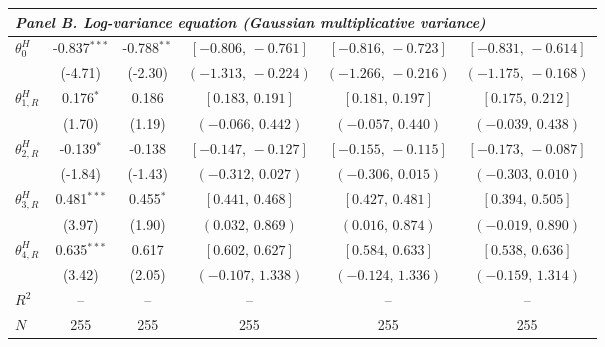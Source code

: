 \begin{table}[!htbp]
\begin{threeparttable}
\begin{tabular}{lccccc}
\midrule
\multicolumn{6}{l}{\textit{Panel B. Log-variance equation (Gaussian multiplicative variance)}} \\
\midrule
$\theta^{H}_0$ & -0.837$^{***}$ & -0.788$^{**}$ & $[-0.806,\,-0.761]$ & $[-0.816,\,-0.723]$ & $[-0.831,\,-0.614]$ \\
 & (-4.71) & (-2.30) & $(-1.313,\,-0.224)$ & $(-1.266,\,-0.216)$ & $(-1.175,\,-0.168)$ \\
\midrule
$\theta^{H}_{1,R}$ & 0.176$^{*}$ & 0.186 & $[0.183,\,0.191]$ & $[0.181,\,0.197]$ & $[0.175,\,0.212]$ \\
 & (1.70) & (1.19) & $(-0.066,\,0.442)$ & $(-0.057,\,0.440)$ & $(-0.039,\,0.438)$ \\
$\theta^{H}_{2,R}$ & -0.139$^{*}$ & -0.138 & $[-0.147,\,-0.127]$ & $[-0.155,\,-0.115]$ & $[-0.173,\,-0.087]$ \\
 & (-1.84) & (-1.43) & $(-0.312,\,0.027)$ & $(-0.306,\,0.015)$ & $(-0.303,\,0.010)$ \\
$\theta^{H}_{3,R}$ & 0.481$^{***}$ & 0.455$^{*}$ & $[0.441,\,0.468]$ & $[0.427,\,0.481]$ & $[0.394,\,0.505]$ \\
 & (3.97) & (1.90) & $(0.032,\,0.869)$ & $(0.016,\,0.874)$ & $(-0.019,\,0.890)$ \\
$\theta^{H}_{4,R}$ & 0.635$^{***}$ & 0.617 & $[0.602,\,0.627]$ & $[0.584,\,0.633]$ & $[0.538,\,0.636]$ \\
 & (3.42) & (2.05) & $(-0.107,\,1.338)$ & $(-0.124,\,1.336)$ & $(-0.159,\,1.314)$ \\
\midrule
$R^2$ & -- & -- & -- & -- & -- \\
$N$ & 255 & 255 & 255 & 255 & 255 \\
\bottomrule
\end{tabular}
\begin{tablenotes}[flushleft]
\scriptsize

\end{tablenotes}
\end{threeparttable}
\end{table}
